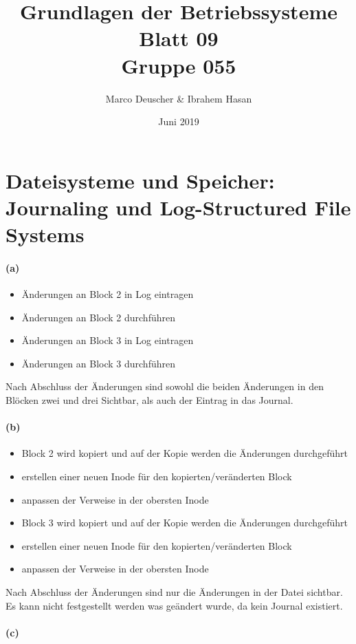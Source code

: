 \documentclass[a4paper]{article}
\title{Grundlagen der Betriebssysteme\\ Blatt 09 \\ Gruppe 055}
\author{Marco Deuscher & Ibrahem Hasan}
\date{Juni 2019}
\begin{document}
\maketitle

\section{Dateisysteme und Speicher: Journaling und Log-Structured File Systems}

\paragraph{(a)}

\begin{itemize}
    \item Änderungen an Block 2 in Log eintragen
    \item Änderungen an Block 2 durchführen
    \item Änderungen an Block 3 in Log eintragen
    \item Änderungen an Block 3 durchführen
\end{itemize}
Nach Abschluss der Änderungen sind sowohl die beiden Änderungen in den Blöcken zwei und drei Sichtbar, als auch der Eintrag in das Journal.

\paragraph{(b)}
\begin{itemize}
    \item Block 2 wird kopiert und auf der Kopie werden die Änderungen durchgeführt
    \item erstellen einer neuen Inode für den kopierten/veränderten Block
    \item anpassen der Verweise in der obersten Inode
    \item Block 3 wird kopiert und auf der Kopie werden die Änderungen durchgeführt
    \item erstellen einer neuen Inode für den kopierten/veränderten Block
    \item anpassen der Verweise in der obersten Inode
\end{itemize}
Nach Abschluss der Änderungen sind nur die Änderungen in der Datei sichtbar. Es kann nicht festgestellt werden was geändert wurde, da kein Journal existiert.

\paragraph{(c)}
\end{document}

